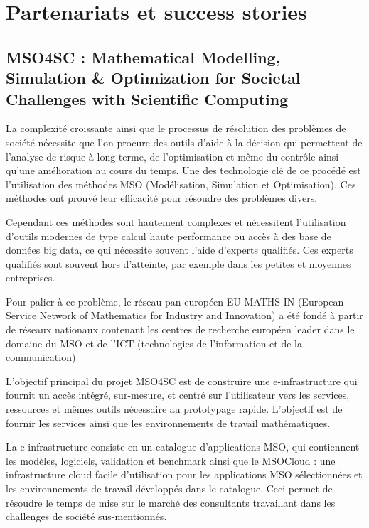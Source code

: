 \section*{Partenariats et success stories}

\subsection*{MSO4SC : Mathematical Modelling, Simulation \& Optimization for Societal Challenges with Scientific Computing}

La complexité croissante ainsi que le processus de résolution des problèmes de société nécessite que l'on procure des outils d'aide à la décision qui permettent de l'analyse de risque à long terme, de l'optimisation et même du contrôle ainsi qu'une amélioration au cours du temps.
Une des technologie clé de ce procédé est l'utilisation des méthodes MSO (Modélisation, Simulation et Optimisation). Ces méthodes ont prouvé leur efficacité pour résoudre des problèmes divers.

Cependant ces méthodes sont hautement complexes et nécessitent l'utilisation d'outils modernes de type calcul haute performance ou accès à des base de données big data, ce qui nécessite souvent l'aide d'experts qualifiés. Ces experts qualifiés sont souvent hors d'atteinte, par exemple dans les petites et moyennes entreprises.

Pour palier à ce problème, le réseau pan-européen EU-MATHS-IN (European Service Network of Mathematics for Industry and Innovation) a été fondé à partir de réseaux nationaux contenant les centres de recherche européen leader dans le domaine du MSO et de l'ICT (technologies de l'information et de la communication)

L'objectif principal du projet MSO4SC est de construire une e-infrastructure qui fournit un accès intégré, sur-mesure, et centré sur l'utilisateur vers les services, ressources et mêmes outils nécessaire au prototypage rapide. L'objectif est de fournir les services ainsi que les environnements de travail mathématiques.

La e-infrastructure consiste en un catalogue d'applications MSO, qui contiennent les modèles, logiciels, validation et benchmark ainsi que le MSOCloud : une infrastructure cloud facile d'utilisation pour les applications MSO sélectionnées et les environnements de travail développés dans le catalogue.
Ceci permet de résoudre le temps de mise sur le marché des consultants travaillant dans les challenges de société sus-mentionnés.

